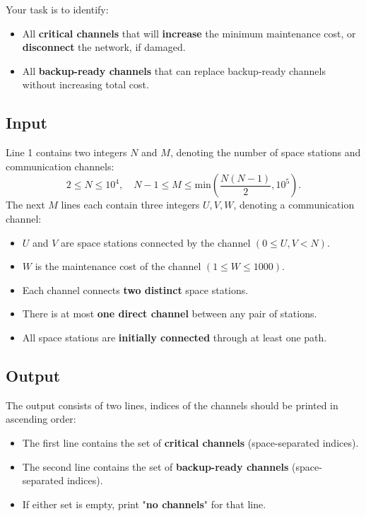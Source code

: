\documentclass[12pt,a4paper]{article}
\begin{document}
\noindent
Your task is to identify:
\begin{itemize}
    \item All \textbf{critical channels} that will \textbf{increase} the minimum maintenance cost, or \textbf{disconnect} the network, if damaged.
    \item All \textbf{backup-ready channels} that can replace backup-ready channels without increasing total cost.
\end{itemize}

\subsection*{\fontsize{16}{12}Input}
Line 1 contains two integers \( N \) and \( M \), denoting the number of space stations and communication channels:
    \[
    2 \leq N \leq 10^4, \quad N-1 \leq M \leq \text{min}(\frac{N(N-1)}{2},10^5).
    \]
\noindent
The next \( M \) lines each contain three integers \( U, V, W \), denoting a communication channel:
    \begin{itemize}
        \item \( U \) and \( V \) are space stations connected by the channel \((0 \leq U, V < N)\).
        \item \( W \) is the maintenance cost of the channel \((1 \leq W \leq 1000)\).
        \item Each channel connects \textbf{two distinct} space stations.
        \item There is at most \textbf{one direct channel} between any pair of stations.
        \item All space stations are \textbf{initially connected} through at least one path.
    \end{itemize}

\subsection*{\fontsize{16}{12}Output}
The output consists of two lines, indices of the channels should be printed in ascending order:
\begin{itemize}
    \item The first line contains the set of \textbf{critical channels} (space-separated indices).
    \item The second line contains the set of \textbf{backup-ready channels} (space-separated indices).
    \item If either set is empty, print "\textbf{no channels}" for that line.
\end{itemize}
\end{document}
